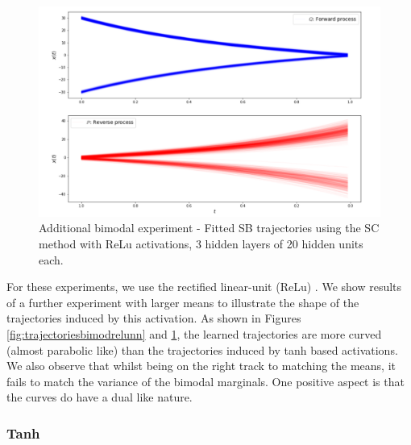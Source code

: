 \documentclass[a4paper,12pt,twoside,openright]{report}
\theoremstyle{definition}
\begin{document}
\begin{figure}
    \centering
    \includegraphics[scale=0.7,trim={0cm 0cm 0cm 0}, clip]{images/Control/almost_perfect_bimodal_relu.PNG}
    \caption{ Additional bimodal experiment - Fitted SB  trajectories using the SC method with ReLu activations, 3 hidden layers of 20 hidden units each.}
    \label{fig:trajectoriesbimodrelunn_}
\end{figure}

For these experiments, we use the rectified linear-unit (ReLu) \citep{glorot2011deep}. We show results of a further experiment with larger means to illustrate the shape of the trajectories induced by this activation. As shown in Figures \ref{fig:trajectoriesbimodrelunn} and \ref{fig:trajectoriesbimodrelunn_}, the learned trajectories are more curved (almost parabolic like) than the trajectories induced by tanh based activations. We also observe that whilst being on the right track to matching the means, it fails to match the variance of the bimodal marginals. One positive aspect is that the curves do have a dual like nature.

\subsubsection{Tanh}
\end{document}

